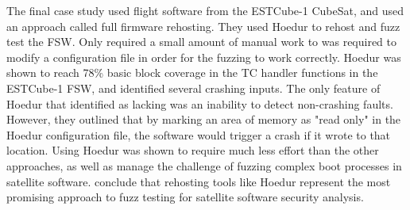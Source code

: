 \documentclass[../report.tex]{subfiles}
\begin{document}
The final case study used flight software from the ESTCube-1 CubeSat, and used
an approach \citet{Willbold_2024} called full firmware rehosting. They used
Hoedur \citep{Hoedur_2023} to rehost and fuzz test the FSW. Only required
a small amount of manual work to was required to modify a configuration file in
order for the fuzzing to work correctly. Hoedur was shown to reach 78\% basic
block coverage in the TC handler functions in the ESTCube-1 FSW, and identified
several crashing inputs. The only feature of Hoedur that \citet{Willbold_2024}
identified as lacking was an inability to detect non-crashing faults. However,
they outlined that by marking an area of memory as "read only" in the Hoedur
configuration file, the software would trigger a crash if it wrote to that
location. Using Hoedur was shown to require much less effort than the other
approaches, as well as manage the challenge of fuzzing complex boot processes
in satellite software. \citet{Willbold_2024} conclude that rehosting tools
like Hoedur represent the most promising approach to fuzz testing for satellite
software security analysis.





%
\end{document}
